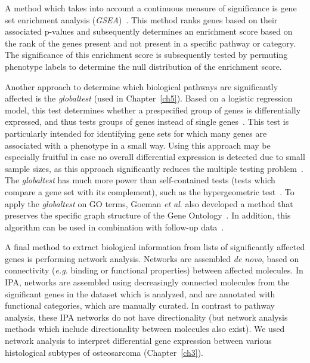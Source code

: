A method which takes into account a continuous measure of significance is gene set enrichment analysis ({\it GSEA})~\cite{subramanian2005gene}. This method ranks genes based on their associated p-values and subsequently determines an enrichment score based on the rank of the genes present and not present in a specific pathway or category. The significance of this enrichment score is subsequently tested by permuting phenotype labels to determine the null distribution of the enrichment score. 

Another approach to determine which biological pathways are significantly affected is the {\it globaltest} (used in Chapter~\ref{ch5}). Based on a logistic regression model, this test determines whether a prespecified group of genes is differentially expressed, and thus tests groups of genes instead of single genes~\cite{goeman2004global}. This test is particularly intended for identifying gene sets for which many genes are associated with a phenotype in a small way. Using this approach may be especially fruitful in case no overall differential expression is detected due to small sample sizes, as this approach significantly reduces the multiple testing problem~\cite{goeman2005testing}. The {\it globaltest} has much more power than self\hyp{}contained tests (tests which compare a gene set with its complement), such as the hypergeometric test~\cite{goeman2007analyzing}. To apply the {\it globaltest} on GO terms, Goeman {\it et al}. also developed a method that preserves the specific graph structure of the Gene Ontology~\cite{goeman2008multiple}. In addition, this algorithm can be used in combination with follow\hyp{}up data~\cite{goeman2005testing}.

A final method to extract biological information from lists of significantly affected genes is performing network analysis. Networks are assembled {\it de novo}, based on connectivity ({\it e.g.} binding or functional properties) between affected molecules. In IPA, networks are assembled using decreasingly connected molecules from the significant genes in the dataset which is analyzed, and are annotated with functional categories, which are manually curated. In contrast to pathway analysis, these IPA networks do not have directionality (but network analysis methods which include directionality between molecules also exist). We used network analysis to interpret differential gene expression between various histological subtypes of osteosarcoma (Chapter~\ref{ch3}).

%
